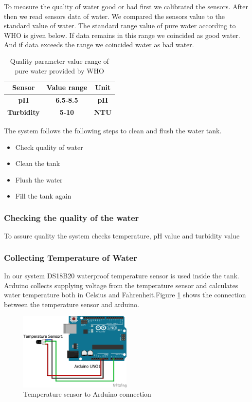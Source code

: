 To measure the quality of water good or bad first we calibrated the sensors. After then we read sensors data of water. We compared the sensors value to the standard value of water. The standard range value of pure water according to WHO is given below. If data remains in this range we coincided as good water. And if data exceeds the range we coincided water as bad water.
\begin{table}[H]
\centering
\caption{Quality parameter value range of pure water provided by WHO}
\begin{tabular}{|c|c|c|}
\hline
\textbf{Sensor}    & \textbf{Value range} & \textbf{Unit} \\ \hline
\textbf{pH}        & \textbf{6.5-8.5}     & \textbf{pH}   \\ \hline
\textbf{Turbidity} & \textbf{5-10}        & \textbf{NTU}  \\ \hline
\end{tabular}
\end{table}

The system follows the following steps to clean and flush the water tank.
\begin{itemize}
    \item Check quality of water
    \item Clean the tank
    \item Flush the water
    \item Fill the tank again
\end{itemize}
\subsubsection{Checking the quality of the water}
To assure quality the system checks temperature, pH value and turbidity value
\subsubsection*{Collecting Temperature of Water}
In our system DS18B20 waterproof temperature sensor is used inside the tank. Arduino collects supplying voltage from the temperature sensor and calculates water temperature both in Celsius and Fahrenheit.Figure \ref{TempSensor} shows the connection between the temperature sensor and arduino.
\begin{figure}[H]
\centering
\includegraphics[width=0.5\textwidth]{figures/Temperature_bb.png}
\caption{Temperature sensor to Arduino connection}
\label{TempSensor}
\end{figure}

